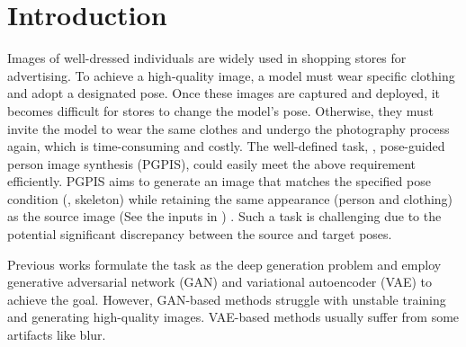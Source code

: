 \section{Introduction}
\label{sec:intro}

Images of well-dressed individuals are widely used in shopping stores for advertising. To achieve a high-quality image, a model must wear specific clothing and adopt a designated pose. Once these images are captured and deployed, it becomes difficult for stores to change the model's pose.
%
Otherwise, they must invite the model to wear the same clothes and undergo the photography process again, which is time-consuming and costly.
%
The well-defined task, \ie, pose-guided person image synthesis (PGPIS), could easily meet the above requirement efficiently. 
%
PGPIS aims to generate an image that matches the specified pose condition (\eg, skeleton) while retaining the same appearance (person and clothing) as the source image (See the inputs in ) \cite{ma2017pose,liu2019liquid,zhu2019progressive}.
%
Such a task is challenging due to the potential significant discrepancy between the source and target poses.

Previous works formulate the task as the deep generation problem and employ generative adversarial network (GAN) \cite{zhou2022cross,zhang2022exploring,zhang2021pise,sarkar2021style,tang2020xinggan,zhu2019progressive,siarohin2018deformable} and variational autoencoder (VAE) \cite{esser2018variational} to achieve the goal. 
%
However, GAN-based methods struggle with unstable training and generating high-quality images. VAE-based methods usually suffer from some artifacts like blur. 

